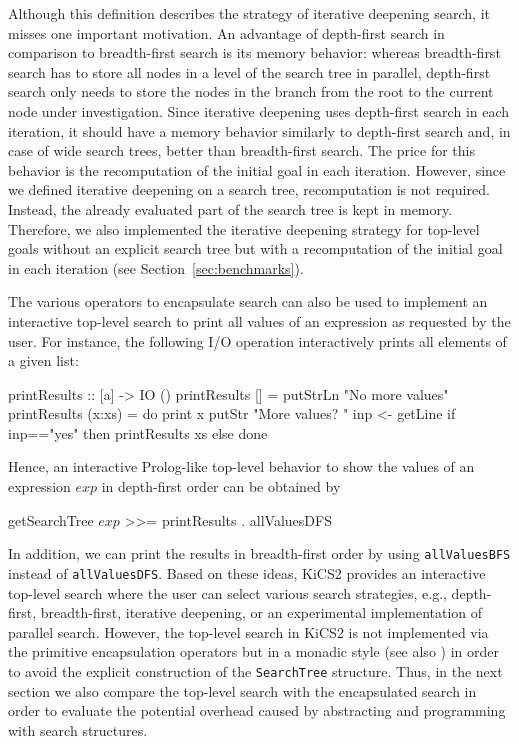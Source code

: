 \documentclass[english]{lni}
\newcommand{\code}[1]{\texttt{\small{}#1}}
\begin{document}
%
Although this definition describes the strategy of
iterative deepening search, it misses one important motivation.
An advantage of depth-first search
in comparison to breadth-first search is its memory behavior:
whereas breadth-first search has to store all nodes
in a level of the search tree in parallel, depth-first search
only needs to store the nodes in the branch from the root
to the current node under investigation.
Since iterative deepening uses depth-first search in each iteration,
it should have a memory behavior similarly to depth-first search
and, in case of wide search trees,
better than breadth-first search.
The price for this behavior is the recomputation of the initial
goal in each iteration. 
However, since we defined iterative deepening on a search tree,
recomputation is not required. Instead, the
already evaluated part of the search tree is kept in memory.
Therefore, we also implemented the iterative deepening strategy
for top-level goals without an explicit search tree
but with a recomputation of the initial goal in each iteration
(see Section~\ref{sec:benchmarks}).

The various operators to encapsulate search can also
be used to implement an interactive top-level search
to print all values of an expression as requested by the user.
For instance, the following I/O operation interactively 
prints all elements of a given list:
\begin{curry}
printResults :: [a] -> IO ()
printResults []     = putStrLn "No more values"
printResults (x:xs) = do print x
                         putStr "More values? "
                         inp <- getLine
                         if inp=="yes" then printResults xs
                                       else done
\end{curry}
Hence, an interactive Prolog-like top-level behavior
to show the values of an expression $exp$ in depth-first order
can be obtained by
\begin{curry}
getSearchTree $exp$ >>= printResults . allValuesDFS
\end{curry}
In addition, we can print the results in breadth-first order
by using \code{allValuesBFS} instead of \code{allValuesDFS}.
Based on these ideas, KiCS2 provides an interactive top-level search
where the user can select various search strategies,
e.g., depth-first, breadth-first, iterative deepening, or
an experimental implementation of parallel search.
However, the top-level search in KiCS2 is not implemented
via the primitive encapsulation operators but in
a monadic style (see also \cite{BrasselHanusPeemoellerReck11})
in order to avoid the explicit construction
of the \code{SearchTree} structure.
Thus, in the next section we also compare the top-level search
with the encapsulated search in order to evaluate the potential overhead
caused by abstracting and programming with search structures.
\end{document}
